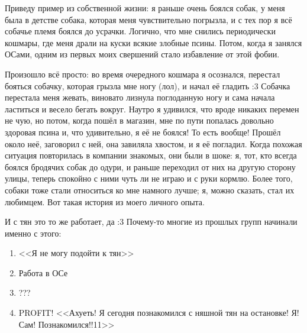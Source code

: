 \documentclass[a5paper,12pt,twoside]{memoir}
\begin{document}
Приведу пример из собственной жизни: я раньше очень боялся собак, у меня была в детстве собака, которая меня чувствительно погрызла, и с тех пор я всё собачье племя боялся до усрачки. Логично, что мне снились периодически кошмары, где меня драли на куски всякие злобные псины. Потом, когда я занялся ОСами, одним из первых моих свершений стало избавление от этой фобии.

Произошло всё просто: во время очередного кошмара я осознался, перестал бояться собачку, которая грызла мне ногу (лол), и начал её гладить :3 Собачка перестала меня жевать, виновато лизнула поглоданную ногу и сама начала ластиться и весело бегать вокруг. Наутро я удивился, что вроде никаких перемен не чую, но потом, когда пошёл в магазин, мне по пути попалась довольно здоровая псина и, что удивительно, я её не боялся! То есть вообще! Прошёл около неё, заговорил с ней, она завиляла хвостом, и я её погладил. Когда похожая ситуация повторилась в компании знакомых, они были в шоке: я, тот, кто всегда боялся бродячих собак до одури, и раньше переходил от них на другую сторону улицы, теперь спокойно с ними чуть ли не играю и с руки кормлю. Более того, собаки тоже стали относиться ко мне намного лучше; я, можно сказать, стал их любимцем. Вот такая история из моего личного опыта. 

И с тян это то же работает, да :3 Почему-то многие из прошлых групп начинали именно с этого:
\begin{enumerate}
\item <<Я не могу подойти к тян>>
\item Работа в ОСе
\item ???
\item PROFIT! <<Ахуеть! Я сегодня познакомился с няшной тян на остановке! Я! Сам! Познакомился!!11>>
\end{enumerate}
\end{document}
